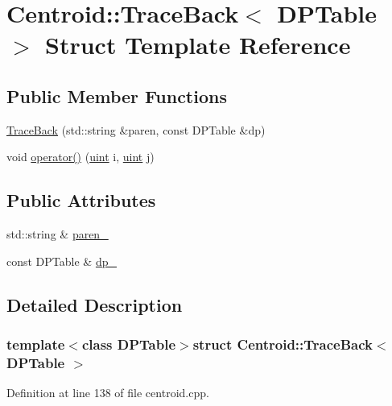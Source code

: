 \hypertarget{struct_centroid_1_1_trace_back}{\section{Centroid\+:\+:Trace\+Back$<$ D\+P\+Table $>$ Struct Template Reference}
\label{struct_centroid_1_1_trace_back}
}
\subsection*{Public Member Functions}
\begin{DoxyCompactItemize}
\item 
\hyperlink{struct_centroid_1_1_trace_back_ae6e8f3a997542c80fedc7d30adcc736c}{Trace\+Back} (std\+::string \&paren, const D\+P\+Table \&dp)
\item 
void \hyperlink{struct_centroid_1_1_trace_back_adf32a5eb4829e47560e6a0655c873ede}{operator()} (\hyperlink{cyktable_8h_a91ad9478d81a7aaf2593e8d9c3d06a14}{uint} i, \hyperlink{cyktable_8h_a91ad9478d81a7aaf2593e8d9c3d06a14}{uint} j)
\end{DoxyCompactItemize}
\subsection*{Public Attributes}
\begin{DoxyCompactItemize}
\item 
std\+::string \& \hyperlink{struct_centroid_1_1_trace_back_a7470cf94b706bec16bb6ec711c7640db}{paren\+\_\+}
\item 
const D\+P\+Table \& \hyperlink{struct_centroid_1_1_trace_back_a4def6deb41a8a79484df386bcee24925}{dp\+\_\+}
\end{DoxyCompactItemize}


\subsection{Detailed Description}
\subsubsection*{template$<$class D\+P\+Table$>$struct Centroid\+::\+Trace\+Back$<$ D\+P\+Table $>$}



Definition at line 138 of file centroid.\+cpp.



